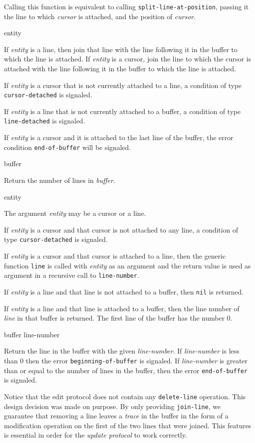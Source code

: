 Calling this function is equivalent to calling
\texttt{split-line-at-position}, passing it the line to which
\textit{cursor} is attached, and the position of \textit{cursor}.

\ifdetached{}

 {entity}

If \textit{entity} is a line, then join that line with the line
following it in the buffer to which the line is attached.  If
\textit{entity} is a cursor, join the line to which the cursor is
attached with the line following it in the buffer to which the line is
attached.

If \textit{entity} is a cursor that is not currently attached to a
line, a condition of type \texttt{cursor-detached} is signaled.

If \textit{entity} is a line that is not currently attached to a
buffer, a condition of type \texttt{line-detached} is signaled.

If \textit{entity} is a cursor and it is attached to the last line of
the buffer, the error condition \texttt{end-of-buffer} will be
signaled.

 {buffer}

Return the number of lines in \textit{buffer}.

 {entity}

The argument \textit{entity} may be a cursor or a line.

If \textit{entity} is a cursor and that cursor is not attached to any
line, a condition of type \texttt{cursor-detached} is signaled.

If \textit{entity} is a cursor and that cursor is attached to a line,
then the generic function \texttt{line}  is
called with \textit{entity} as an argument and the return value is
used as argument in a recursive call to \texttt{line-number}.

If \textit{entity} is a line and that line is not attached to a
buffer, then \texttt{nil} is returned.

If \textit{entity} is a line and that line is attached to a buffer,
then the line number of \textit{line} in that buffer is returned.  The
first line of the buffer has the number $0$.

 {buffer line-number}

Return the line in the buffer with the given \textit{line-number}.  If
\textit{line-number} is less than $0$ then the error
\texttt{beginning-of-buffer} is signaled.  If \textit{line-number} is
greater than or equal to the number of lines in the buffer, then the
error \texttt{end-of-buffer} is signaled.

Notice that the edit protocol does not contain any
\texttt{delete-line} operation.  This design decision was made on
purpose.  By only providing \texttt{join-line}, we guarantee that
removing a line leaves a \emph{trace} in the buffer in the form of a
modification operation on the first of the two lines that were
joined.  This features is essential in order for the \emph{update
  protocol} to work correctly.

